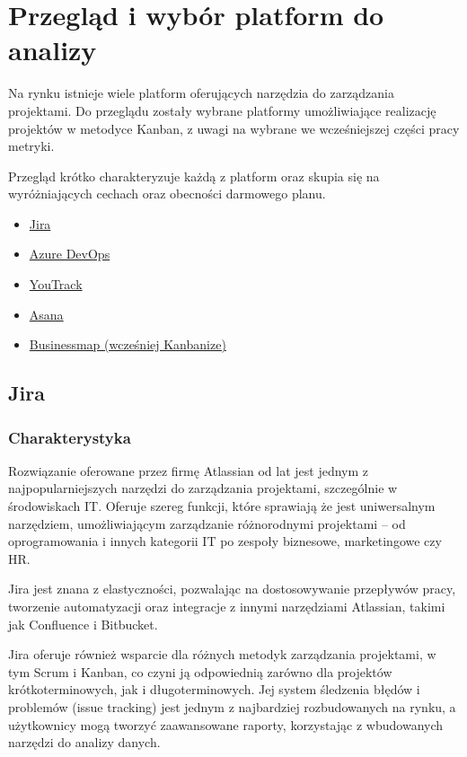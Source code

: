\section{Przegląd i wybór platform do analizy}
Na rynku istnieje wiele platform oferujących narzędzia do zarządzania projektami. Do przeglądu zostały wybrane platformy umożliwiające realizację projektów w metodyce Kanban, z uwagi na wybrane we wcześniejszej
części pracy metryki.

Przegląd krótko charakteryzuje każdą z platform oraz skupia się na wyróżniających cechach oraz obecności darmowego planu.
\begin{itemize}
    \item \href{https://www.atlassian.com/software/jira}{Jira}
    \item \href{https://azure.microsoft.com/en-us/products/devops/}{Azure DevOps}
    \item \href{https://www.jetbrains.com/youtrack/}{YouTrack}
    \item \href{https://asana.com/}{Asana}
    \item \href{https://businessmap.io/}{Businessmap (wcześniej Kanbanize)}
\end{itemize}

\subsection{Jira}
\subsubsection*{Charakterystyka}
Rozwiązanie oferowane przez firmę Atlassian od lat jest jednym z najpopularniejszych narzędzi do zarządzania projektami, szczególnie w środowiskach IT. Oferuje szereg funkcji, które sprawiają że jest uniwersalnym
narzędziem, umożliwiającym zarządzanie różnorodnymi projektami -- od oprogramowania i innych kategorii IT po zespoły biznesowe, marketingowe czy HR.

Jira jest znana z elastyczności, pozwalając na dostosowywanie przepływów pracy, tworzenie automatyzacji oraz integracje z innymi narzędziami Atlassian, takimi jak Confluence i Bitbucket.

Jira oferuje również wsparcie dla różnych metodyk zarządzania projektami, w tym Scrum i Kanban, co czyni ją odpowiednią zarówno dla projektów krótkoterminowych, jak i długoterminowych. Jej system śledzenia błędów i problemów (issue tracking)
jest jednym z najbardziej rozbudowanych na rynku, a użytkownicy mogą tworzyć zaawansowane raporty, korzystając z wbudowanych narzędzi do analizy danych.

